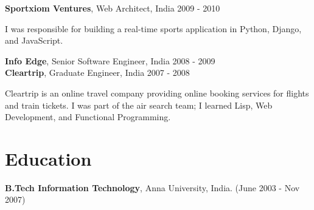 \documentclass[margin, line, 10pt]{res}
\begin{document}
\begin{resume}
{\Large {\bf Sportxiom Ventures}}, Web Architect, India  \hfill 2009 - 2010\\
\vspace{-.3cm}
\begin{adjustwidth}{.5em}{0pt}
I was responsible for building a real-time sports application in Python, Django,
and JavaScript.
\end{adjustwidth}
\vspace{.05cm}

{\Large {\bf Info Edge}}, Senior Software Engineer, India \hfill 2008 - 2009 \\

{\Large {\bf Cleartrip}}, Graduate Engineer, India \hfill 2007 - 2008\\
\vspace{-.3cm}
\begin{adjustwidth}{.5em}{0pt}
  Cleartrip is an online travel company providing online booking services for flights and train tickets. I was part of the air search team; I learned Lisp, Web Development, and Functional Programming.
\end{adjustwidth}
\vspace{.05cm}

\section{Education}
{\bf B.Tech Information Technology}, Anna University, India. \hfill (June 2003 - Nov 2007)


\end{resume}
\end{document}
